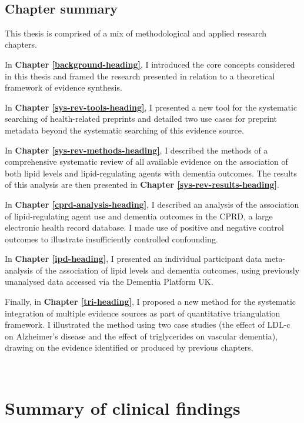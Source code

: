 \documentclass[a4paper, twoside]{templates/ociamthesis}
\begin{document}
~

\hypertarget{chapter-summary}{%
\subsection{Chapter summary}\label{chapter-summary}}

This thesis is comprised of a mix of methodological and applied research chapters.

In \textbf{Chapter \ref{background-heading}}, I introduced the core concepts considered in this thesis and framed the research presented in relation to a theoretical framework of evidence synthesis.

In \textbf{Chapter \ref{sys-rev-tools-heading}}, I presented a new tool for the systematic searching of health-related preprints and detailed two use cases for preprint metadata beyond the systematic searching of this evidence source.

In \textbf{Chapter \ref{sys-rev-methods-heading}}, I described the methods of a comprehensive systematic review of all available evidence on the association of both lipid levels and lipid-regulating agents with dementia outcomes. The results of this analysis are then presented in \textbf{Chapter \ref{sys-rev-results-heading}}.

In \textbf{Chapter \ref{cprd-analysis-heading}}, I described an analysis of the association of lipid-regulating agent use and dementia outcomes in the CPRD, a large electronic health record database. I made use of positive and negative control outcomes to illustrate insufficiently controlled confounding.

In \textbf{Chapter \ref{ipd-heading}}, I presented an individual participant data meta-analysis of the association of lipid levels and dementia outcomes, using previously unanalysed data accessed via the Dementia Platform UK.

Finally, in \textbf{Chapter \ref{tri-heading}}, I proposed a new method for the systematic integration of multiple evidence sources as part of quantitative triangulation framework. I illustrated the method using two case studies (the effect of LDL-c on Alzheimer's disease and the effect of triglycerides on vascular dementia), drawing on the evidence identified or produced by previous chapters.

~

\hypertarget{summary-of-clinical-findings}{%
\section{Summary of clinical findings}\label{summary-of-clinical-findings}}
\end{document}
